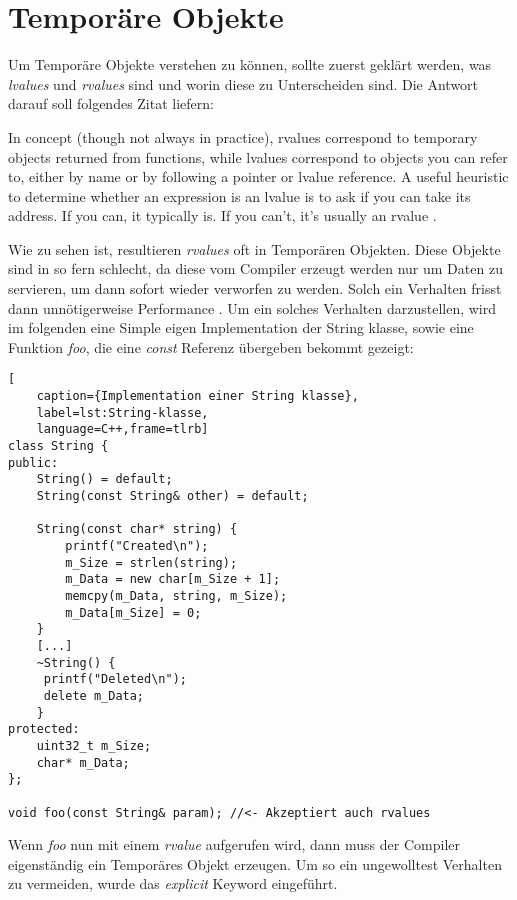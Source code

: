 \section{Temporäre Objekte}
Um Temporäre Objekte verstehen zu können, sollte zuerst geklärt werden, was \emph{lvalues} und
\emph{rvalues} sind und worin diese zu Unterscheiden sind. Die Antwort darauf soll folgendes
Zitat liefern:
\begin{zitat}
	In concept (though not always in practice), rvalues correspond to temporary
	objects returned from functions, while lvalues correspond to objects you can refer to, either by
	name or by following a pointer or lvalue reference. A useful heuristic to determine whether an
	expression is an lvalue is to ask if you can take its address. If you can, it typically is. If
	you can’t, it’s usually an rvalue \cite{EffectiveC++}.
\end{zitat}
Wie zu sehen ist, resultieren \emph{rvalues} oft in Temporären Objekten. Diese Objekte sind in so
fern schlecht, da diese vom Compiler erzeugt werden nur um Daten zu servieren, um dann sofort
wieder verworfen zu werden. Solch ein Verhalten frisst dann unnötigerweise Performance
.\cite{HandsOn}
\newline
\newline
Um ein solches Verhalten darzustellen, wird im folgenden eine Simple eigen Implementation der
String klasse, sowie eine Funktion \emph{foo}, die eine \emph{const} Referenz übergeben bekommt
gezeigt:

\begin{lstlisting}[
    caption={Implementation einer String klasse},
    label=lst:String-klasse,
    language=C++,frame=tlrb]
class String {
public:
	String() = default;
	String(const String& other) = default;

	String(const char* string) {
		printf("Created\n");
		m_Size = strlen(string);
		m_Data = new char[m_Size + 1];
		memcpy(m_Data, string, m_Size);
		m_Data[m_Size] = 0;
	}
	[...]
	~String() {
     printf("Deleted\n");
     delete m_Data;
    }
protected:
    uint32_t m_Size;
    char* m_Data;
};

void foo(const String& param); //<- Akzeptiert auch rvalues
\end{lstlisting}

Wenn \emph{foo} nun mit einem \emph{rvalue} aufgerufen wird, dann muss der Compiler eigenständig
ein Temporäres Objekt erzeugen. Um so ein ungewolltest Verhalten zu vermeiden, wurde das
\emph{explicit} Keyword eingeführt.